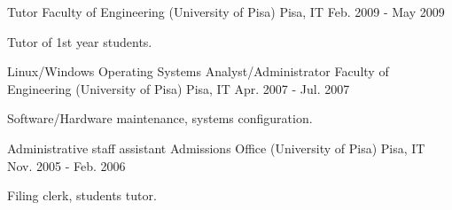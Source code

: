 \begin{cventries}
  \cventry
    {Tutor} %
    {Faculty of Engineering (University of Pisa)} %
    {Pisa, IT} %
    {Feb. 2009 - May 2009} %
    {
      \begin{cvitems} %
	\item {Tutor of 1st year students.}
      \end{cvitems}
    }

  \cventry
    {Linux/Windows Operating Systems Analyst/Administrator} %
    {Faculty of Engineering (University of Pisa)} %
    {Pisa, IT} %
    {Apr. 2007 - Jul. 2007} %
    {
      \begin{cvitems} %
	\item {Software/Hardware maintenance, systems configuration.}
      \end{cvitems}
    }

  \cventry
    {Administrative staff assistant} %
    {Admissions Office (University of Pisa)} %
    {Pisa, IT} %
    {Nov. 2005 - Feb. 2006} %
    {
      \begin{cvitems} %
	\item {Filing clerk, students tutor.}
      \end{cvitems}
    }

\end{cventries}
